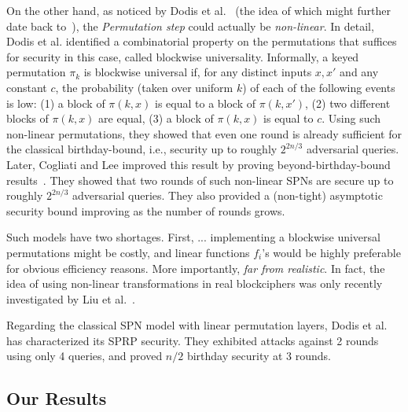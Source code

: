 On the other hand, as noticed by Dodis et al.~\cite{EPRINT:DKSSZZ18} (the idea of which might further date back to~\cite{FSE:ChaSar06,C:Halevi07}), the {\it Permutation step} could actually be {\it non-linear}. In detail, Dodis et al. identified a combinatorial property on the permutations that suffices for security in this case, called blockwise universality. Informally, a keyed permutation $\pi_k$ is blockwise universal if, for any distinct inputs $x,x'$ and any constant $c$, the probability (taken over uniform $k$) of each of the following events is low: (1) a block of $\pi(k,x)$ is equal to a block of $\pi(k,x')$, (2) two different blocks of $\pi(k,x)$ are equal, (3) a block of $\pi(k,x)$ is equal to $c$. Using such non-linear permutations, they showed that even one round is already sufficient for the classical birthday-bound, i.e., security up to roughly $2^{2n/3}$ adversarial queries. Later, Cogliati and Lee improved this result by proving beyond-birthday-bound results~\cite{EPRINT:DKSSZZ18}. They showed that two rounds of such non-linear SPNs are secure up to roughly $2^{2n/3}$ adversarial queries. They also provided a (non-tight) asymptotic security bound improving as the number of rounds grows.



Such models have two shortages. First, ... implementing a blockwise universal permutations might be costly, and linear functions $f_i$'s would be highly preferable for obvious efficiency reasons. More importantly, {\it far from realistic}. In fact, the idea of using non-linear transformations in real blockciphers was only recently investigated by Liu et al.~\cite{DBLP:journals/dcc/LiuRL18}.



Regarding the classical SPN model with linear permutation layers, Dodis et al. has characterized its SPRP security.
They exhibited attacks against 2 rounds using only 4 queries, and proved $n/2$ birthday security at 3 rounds.





\subsection{Our Results}


